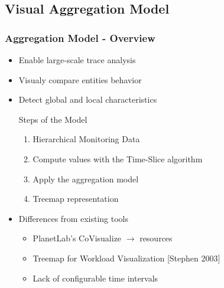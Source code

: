 \subsection{Visual Aggregation Model}


\frame
{
   \frametitle{Aggregation Model - Overview}
   \begin{itemize}
   \item Enable large-scale trace analysis
   \item Visualy compare entities behavior
   \item Detect global and local characteristics

   \vfill

   \begin{block}{Steps of the Model}
      \begin{enumerate}
      \item Hierarchical Monitoring Data
      \item Compute values with the Time-Slice algorithm
      \item Apply the aggregation model
      \item Treemap representation
      \end{enumerate}
   \end{block}

   \vfill
   \item Differences from existing tools
      \begin{itemize}
      \item PlanetLab's CoVisualize $\rightarrow$ resources
      \item Treemap for Workload Visualization [Stephen 2003]
      \vspace{.2cm}
      \item Lack of configurable time intervals
      \end{itemize}
   \end{itemize}
}


